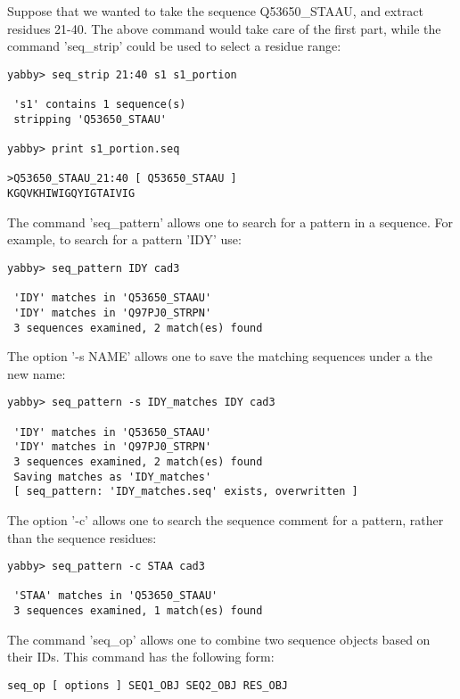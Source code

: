 Suppose that we wanted to take the sequence Q53650\_STAAU, and
extract residues 21-40. The above command would take care of the
first part, while the command 'seq\_strip' could be used to
select a residue range:


\begin{verbatim}
yabby> seq_strip 21:40 s1 s1_portion

 's1' contains 1 sequence(s)
 stripping 'Q53650_STAAU'

yabby> print s1_portion.seq

>Q53650_STAAU_21:40 [ Q53650_STAAU ]
KGQVKHIWIGQYIGTAIVIG
\end{verbatim}

The command 'seq\_pattern' allows one to search for a pattern
in a sequence. For example, to search for a pattern 'IDY' use: 


\begin{verbatim}
yabby> seq_pattern IDY cad3

 'IDY' matches in 'Q53650_STAAU'
 'IDY' matches in 'Q97PJ0_STRPN'
 3 sequences examined, 2 match(es) found
\end{verbatim} 

The option '-s NAME' allows one to save the matching sequences
under a the new name:

\begin{verbatim}
yabby> seq_pattern -s IDY_matches IDY cad3

 'IDY' matches in 'Q53650_STAAU'
 'IDY' matches in 'Q97PJ0_STRPN'
 3 sequences examined, 2 match(es) found
 Saving matches as 'IDY_matches'
 [ seq_pattern: 'IDY_matches.seq' exists, overwritten ]
\end{verbatim}

The option '-c' allows one to search the sequence comment for a
pattern, rather than the sequence residues:

\begin{verbatim}
yabby> seq_pattern -c STAA cad3

 'STAA' matches in 'Q53650_STAAU'
 3 sequences examined, 1 match(es) found
\end{verbatim}

The command 'seq\_op' allows one to combine two sequence objects
based on their IDs. This command has the following form:


\begin{verbatim}
seq_op [ options ] SEQ1_OBJ SEQ2_OBJ RES_OBJ
\end{verbatim}

